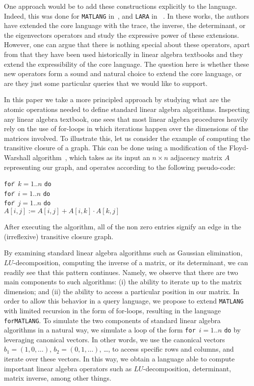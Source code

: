 \documentclass[sigconf]{acmart}
\newcommand{\lara}{\texttt{LARA}\xspace}
\newcommand{\lang}{\texttt{MATLANG}\xspace}
\newcommand{\langfor}{\texttt{for}\text{-}\texttt{MATLANG}\xspace}
\begin{document}
One approach would be to add these constructions explicitly to the language. Indeed, this was done for \lang in~\cite{matlang-journal}, and \lara in ~\cite{BarceloH0S20}. In these works, the authors have extended the core language with the trace, the inverse, the determinant, or the eigenvectors operators and study the expressive power of these extensions. However, one can argue that there is nothing special about these operators, apart from that they have been used historically in linear algebra textbooks and they extend the expressibility of the core language. The question here is whether these new operators form a sound and natural choice to extend the core language, or are they just some particular queries that we would like to support. 

In this paper we take a more principled approach by studying what are the atomic operations needed to define standard linear algebra algorithms. Inspecting any linear algebra textbook, one sees that most linear algebra procedures heavily rely on the use of for-loops in which iterations happen over the dimensions of the matrices involved. To illustrate this, let us consider the example of computing the transitive closure of a graph. This can be done using a modification of the Floyd-Warshall algorithm~\cite{cormen}, which takes as its input an $n\times n$ adjacency matrix $A$ representing our graph, and operates according to the following pseudo-code:
\begin{tabbing}
\quad\texttt{for}\=\,  $k = 1..n$ \texttt{do}\\
\> \texttt{for}\=\,  $i = 1..n$ \texttt{do}\\
\> \> \texttt{for}\=\,  $j = 1..n$ \texttt{do}\\
\> \> \> $A[i,j] := A[i,j] + A[i,k] \cdot A[k,j]$
\end{tabbing}
After executing the algorithm, all of the non zero entries signify an edge in the (irreflexive) transitive closure graph.

By examining standard linear algebra algorithms such as Gaussian elimination, $LU$-decomposition, computing the inverse of a matrix, or its determinant, we can readily see that this pattern continues. Namely, we observe that there are two main components to such algorithms: (i) the ability to iterate up to the matrix dimension; and (ii) the ability to access a particular position in our matrix. In order to allow this behavior in a query language, we propose to extend \lang with limited recursion in the form of for-loops, resulting in the language \langfor. To  simulate the two components of standard linear algebra algorithms in a natural way, we simulate a loop of the form \texttt{for}\, $i=1..n$ \texttt{do} by leveraging canonical vectors. In other words, we use the canonical vectors $b_1=(1,0,\ldots)$, $b_2=(0,1,\ldots)$, \ldots, to access specific rows and columns, and iterate over these vectors. In this way,
we obtain a language able to compute important linear algebra operators such as $LU$-decomposition, determinant, matrix inverse, among other things.
\end{document}
